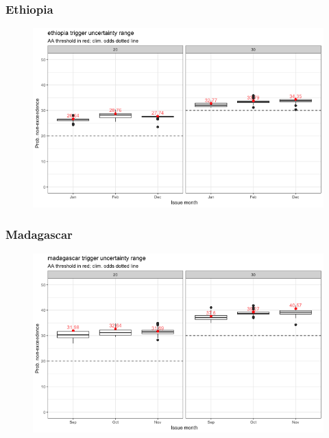 \documentclass{ametsocV5}
\begin{document}



\subsubsection{Ethiopia}

\begin{figure}
    \centering
    \includegraphics[width=0.9\linewidth]{figures/ethiopia.png}
\end{figure}

\subsubsection{Madagascar}

\begin{figure}
    \centering
    \includegraphics[width=0.9\linewidth]{figures/madagascar.png}
\end{figure}
\end{document}
